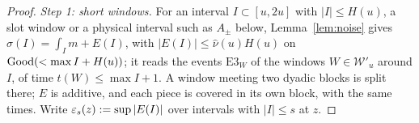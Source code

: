 \begin{proof}
\emph{Step 1: short windows.} For an interval $I\subset[u,2u]$ with $|I|\le H(u)$, a slot window or a physical interval such as
$A_\pm$ below, Lemma~\ref{lem:noise} gives
$\sigma(I)=\int_Im+E(I)$, with $|E(I)|\le\hat\nu(u)H(u)$ on $\mathrm{Good}(<\max I+H(u))$; it reads the events $\mathrm{E3}_W$ of the windows
$W\in\mathcal W'_u$ around $I$, of time $t(W)\le\max I+1$. A window meeting two dyadic blocks is split there; $E$ is additive, and each
piece is covered in its own block, with the same times. Write $\varepsilon_s(z):=\sup|E(I)|$ over intervals with
$|I|\le s$ at $z$.


\end{proof}
